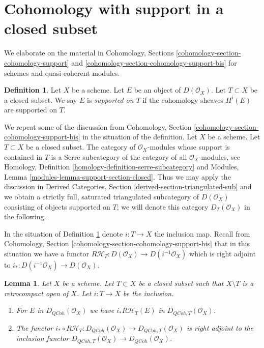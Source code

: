 \documentclass{stacks-project}
\theoremstyle{plain}
\newtheorem{lemma}[subsection]{Lemma}
\theoremstyle{definition}
\newtheorem{definition}[subsection]{Definition}
\theoremstyle{remark}
\numberwithin{equation}{subsection}
\def\QCoh{\mathit{QCoh}}
\begin{document}
\section{Cohomology with support in a closed subset}
\label{section-cohomology-support}

\noindent
We elaborate on the material in Cohomology, Sections
\ref{cohomology-section-cohomology-support} and
\ref{cohomology-section-cohomology-support-bis} for schemes
and quasi-coherent modules.

\begin{definition}
\label{definition-supported-on}
Let $X$ be a scheme. Let $E$ be an object of $D(\mathcal{O}_X)$.
Let $T \subset X$ be a closed subset.
We say $E$ is {\it supported on $T$} if the
cohomology sheaves $H^i(E)$ are supported on $T$.
\end{definition}

\noindent
We repeat some of the discussion from
Cohomology, Section \ref{cohomology-section-cohomology-support-bis}
in the situation of the definition.
Let $X$ be a scheme. Let $T \subset X$ be a closed subset.
The category of $\mathcal{O}_X$-modules whose
support is contained in $T$ is a Serre subcategory of the
category of all $\mathcal{O}_X$-modules, see
Homology, Definition \ref{homology-definition-serre-subcategory}
and
Modules, Lemma \ref{modules-lemma-support-section-closed}.
Thus we may apply the discussion in
Derived Categories, Section \ref{derived-section-triangulated-sub}
and we obtain a strictly full, saturated triangulated subcategory of
$D(\mathcal{O}_X)$ consisting of objects supported on $T$; we will
denote this category $D_T(\mathcal{O}_X)$ in the following.

\medskip\noindent
In the situation of Definition \ref{definition-supported-on}
denote $i : T \to X$ the inclusion map. Recall from
Cohomology, Section \ref{cohomology-section-cohomology-support-bis}
that in this situation we have a functor
$R\mathcal{H}_T : D(\mathcal{O}_X) \to D(i^{-1}\mathcal{O}_X)$
which is right adjoint to $i_* : D(i^{-1}\mathcal{O}_X) \to D(\mathcal{O}_X)$.

\begin{lemma}
\label{lemma-support-quasi-coherent}
Let $X$ be a scheme. Let $T \subset X$ be a closed subset such that
$X \setminus T$ is a retrocompact open of $X$. Let $i : T \to X$ be
the inclusion.
\begin{enumerate}
\item For $E$ in $D_\QCoh(\mathcal{O}_X)$ we have
$i_*R\mathcal{H}_T(E)$ in $D_{\QCoh, T}(\mathcal{O}_X)$.
\item The functor
$i_* \circ R\mathcal{H}_T : D_\QCoh(\mathcal{O}_X) \to
D_{\QCoh, T}(\mathcal{O}_X)$ is right adjoint to the inclusion functor
$D_{\QCoh, T}(\mathcal{O}_X) \to D_\QCoh(\mathcal{O}_X)$.
\end{enumerate}
\end{lemma}
\end{document}
